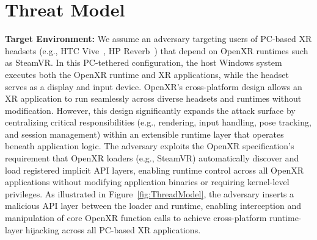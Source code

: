 \documentclass[letterpaper,twocolumn,10pt]{article}
\begin{document}
\begin{table}[]
\centering
\caption{Comparison of state-of-the-art XR SDKs on Cross-Platform (CP) Support, API Layer Extensibility (APLE), Trusted Runtime Attack Surface (TRAS), and Persistence Risk (PR).}
\label{tab:Sdk-table}
\end{table}

\section{Threat Model}
\label{sec:threatmodel}
\textbf{Target Environment:} We assume an adversary targeting users of PC-based XR headsets (e.g., HTC Vive~\cite{htcviveDevice}, HP Reverb~\cite{hpreverbDevice}) that depend on OpenXR runtimes such as SteamVR. In this PC-tethered configuration, the host Windows system executes both the OpenXR runtime and XR applications, while the headset serves as a display and input device. OpenXR's cross-platform design allows an XR application to run seamlessly across diverse headsets and runtimes without modification. However, this design significantly expands the attack surface by centralizing critical responsibilities (e.g., rendering, input handling, pose tracking, and session management) within an extensible runtime layer that operates beneath application logic. The adversary exploits the OpenXR specification's requirement that OpenXR loaders (e.g., SteamVR) automatically discover and load registered implicit API layers, enabling runtime control across all OpenXR applications without modifying application binaries or requiring kernel-level privileges. As illustrated in Figure~\ref{fig:ThreadModel}, the adversary inserts a malicious API layer between the loader and runtime, enabling interception and manipulation of core OpenXR function calls to achieve cross-platform runtime-layer hijacking across all PC-based XR applications.
\end{document}
